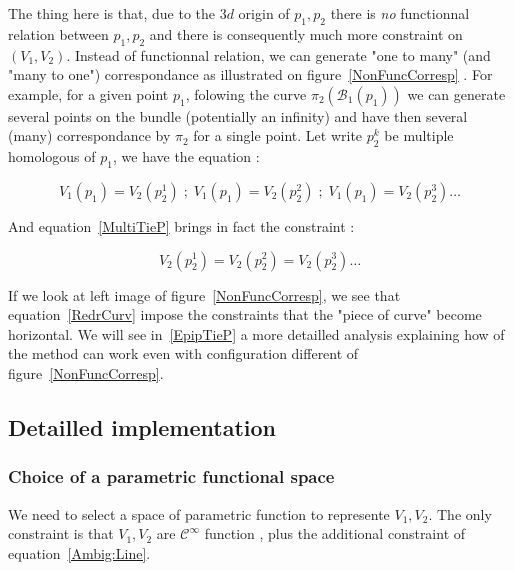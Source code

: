 \documentclass{ipol}
\newcommand{\Bund}[1]{\ensuremath{\mathcal{B}_{#1}}}
\newcommand{\BundO}{\Bund{1}}
\begin{document}
The thing here is that, due to the $3d$ origin of $p_1,p_2$ there is
\emph{no} functionnal relation between $p_1,p_2$ and there is consequently
much more constraint on $(V_1,V_2)$. Instead of functionnal relation,
we can generate  "one to many" (and  "many to one") correspondance as illustrated on figure~\ref{NonFuncCorresp} .
For example, for a given  point $p_1$, folowing the curve $\pi_2(\BundO(p_1))$ we can generate
several points on the bundle (potentially an infinity) and have then several (many) correspondance
by  $\pi_2$ for a single point. Let write $p^k_2$ be multiple homologous of $p_1$,
we have the equation  :


\begin{equation}
    V_1(p_1) = V_2(p^1_2)   \;;\; V_1(p_1) = V_2(p^2_2)   \;;\; V_1(p_1) = V_2(p^3_2)  \dots \label{MultiTieP}
\end{equation}


And equation~\ref{MultiTieP} brings in fact the constraint : 

\begin{equation}
V_2(p^1_2) = V_2(p^2_2)  =  V_2(p^3_2) \dots \label{RedrCurv}
\end{equation}

If we look at left image of figure~\ref{NonFuncCorresp}, we see that equation~\ref{RedrCurv}
impose the constraints that the "piece of curve" become horizontal.
We will see in~\ref{EpipTieP} a more detailled analysis explaining how of the 
method can work even with configuration different of figure~\ref{NonFuncCorresp}.






\subsection{Detailled implementation}


\subsubsection{Choice of a parametric functional space}
\label{ChoicePolyn}

We need to select a space of parametric function to represente $V_1,V_2$. The only constraint
is that $V_1,V_2$ are $\mathcal{C}^{\infty}$ function , plus the additional constraint of 
equation~\ref{Ambig:Line}. 
\end{document}

